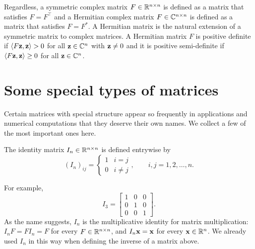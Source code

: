 Regardless, a symmetric complex matrix $F \in \mathbb{R}^{n \times n}$ is defined as a matrix that satisfies $F = F^\top$ and a Hermitian complex matrix $F \in \mathbb{C}^{n \times n}$ is defined as a matrix that satisfies $F = F^*$. A Hermitian matrix is the natural extension of a symmetric matrix to complex matrices. A Hermitian matrix $F$ is positive definite if $\langle F \mathbf{z}, \mathbf{z} \rangle > 0$ for all $\mathbf{z} \in \mathbb{C}^n$ with $\mathbf{z} \neq 0$ and it is positive semi-definite if $\langle F \mathbf{z}, \mathbf{z} \rangle \ge 0$ for all $\mathbf{z} \in \mathbb{C}^n$.


\section{Some special types of matrices}

Certain matrices with special structure appear so frequently in applications and numerical computations that they deserve their own names. We collect a few of the most important ones here.

\begin{definition}
    The identity matrix $I_n \in \mathbb{R}^{n \times n}$ is defined entrywise by
    \begin{equation*}
        (I_n)_{ij} = \begin{cases} 1 & i = j \\ 0 & i \neq j \end{cases}, \qquad i,j = 1,2,\ldots,n.
    \end{equation*}
\end{definition}
For example,
\begin{equation*}
    I_3 = \begin{bmatrix}
        1 & 0 & 0 \\
        0 & 1 & 0 \\
        0 & 0 & 1
    \end{bmatrix}.
\end{equation*}
As the name suggests, $I_n$ is the multiplicative identity for matrix multiplication: $I_n F = F I_n = F$ for every $F \in \mathbb{R}^{n \times n}$, and $I_n \mathbf{x} = \mathbf{x}$ for every $\mathbf{x} \in \mathbb{R}^n$. We already used $I_n$ in this way when defining the inverse of a matrix above.

